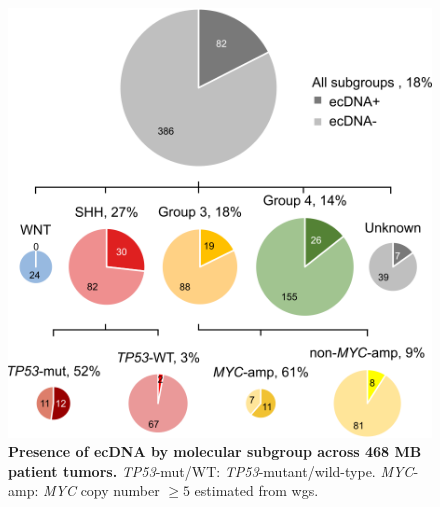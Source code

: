 \begin{figure}[!h]
    \centering
    \includegraphics[]{figures/1-1.png}
    \caption[Presence of ecDNA by molecular subgroup across 468 MB patient tumors.]{\textbf{Presence of ecDNA by molecular subgroup across 468 MB patient tumors.} \textit{TP53}-mut/WT: \textit{TP53}-mutant/wild-type. \textit{MYC}-amp: \textit{MYC} copy number $\geq 5$ estimated from \gls{wgs}.}  
    \label{fig:1a}
\end{figure}

